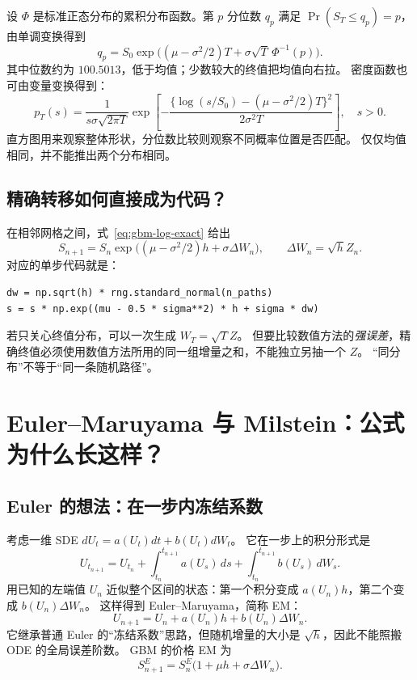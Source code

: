\documentclass[11pt,a4paper,fontset=none]{ctexart}
\numberwithin{equation}{section}
\begin{document}
设 $\Phi$ 是标准正态分布的累积分布函数。第 $p$ 分位数 $q_p$ 满足 $\Pr(S_T\le q_p)=p$，由单调变换得到
\begin{equation}\label{eq:gbm-quantile}
 q_p=S_0\exp\bigl((\mu-\sigma^2/2)T+\sigma\sqrt T\,\Phi^{-1}(p)\bigr).
\end{equation}
其中位数约为 $100.5013$，低于均值；少数较大的终值把均值向右拉。
密度函数也可由变量变换得到：
\begin{equation}\label{eq:gbm-density}
 p_T(s)=\frac1{s\sigma\sqrt{2\pi T}}
 \exp\left[-\frac{\{\log(s/S_0)-(\mu-\sigma^2/2)T\}^2}{2\sigma^2T}\right],\quad s>0.
\end{equation}
直方图用来观察整体形状，分位数比较则观察不同概率位置是否匹配。
仅仅均值相同，并不能推出两个分布相同。

\subsection{精确转移如何直接成为代码？}
在相邻网格之间，式~\eqref{eq:gbm-log-exact} 给出
\begin{equation}\label{eq:gbm-transition}
 S_{n+1}=S_n\exp\bigl((\mu-\sigma^2/2)h+\sigma\Delta W_n\bigr),\qquad
 \Delta W_n=\sqrt h Z_n.
\end{equation}
对应的单步代码就是：
\begin{lstlisting}
dw = np.sqrt(h) * rng.standard_normal(n_paths)
s = s * np.exp((mu - 0.5 * sigma**2) * h + sigma * dw)
\end{lstlisting}
若只关心终值分布，可以一次生成 $W_T=\sqrt T Z$。
但要比较数值方法的\emph{强误差}，精确终值必须使用数值方法所用的同一组增量之和，不能独立另抽一个 $Z$。
“同分布”不等于“同一条随机路径”。

\section{Euler--Maruyama 与 Milstein：公式为什么长这样？}\label{sec:methods}
\subsection{Euler 的想法：在一步内冻结系数}
考虑一维 SDE $dU_t=a(U_t)dt+b(U_t)dW_t$。
它在一步上的积分形式是
\begin{equation}\label{eq:methods-integral}
 U_{t_{n+1}}=U_{t_n}+\int_{t_n}^{t_{n+1}}a(U_s)\,ds+
 \int_{t_n}^{t_{n+1}}b(U_s)\,dW_s.
\end{equation}
用已知的左端值 $U_n$ 近似整个区间的状态：第一个积分变成 $a(U_n)h$，第二个变成 $b(U_n)\Delta W_n$。
这样得到 Euler--Maruyama，简称 EM：
\begin{equation}\label{eq:methods-em-general}
 U_{n+1}=U_n+a(U_n)h+b(U_n)\Delta W_n.
\end{equation}
它继承普通 Euler 的“冻结系数”思路，但随机增量的大小是 $\sqrt h$，因此不能照搬 ODE 的全局误差阶数。
GBM 的价格 EM 为
\begin{equation}\label{eq:methods-em-gbm}
 S_{n+1}^{E}=S_n^{E}\bigl(1+\mu h+\sigma\Delta W_n\bigr).
\end{equation}
\end{document}
